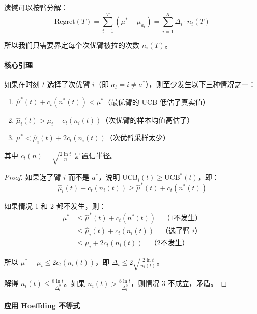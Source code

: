 遗憾可以按臂分解：
\begin{equation}
    \text{Regret}(T) = \sum_{t=1}^{T} (\mu^* - \mu_{a_t}) = \sum_{i=1}^{K} \Delta_i \cdot n_i(T)
\end{equation}

所以我们只需要界定每个次优臂被拉的次数 $n_i(T)$。

\paragraph{核心引理}\mbox{}\par\nopagebreak

\begin{lemma}[次优臂被拉的条件]
如果在时刻 $t$ 选择了次优臂 $i$（即 $a_t = i \neq a^*$），则至少发生以下三种情况之一：
\begin{enumerate}
    \item $\hat{\mu}^*(t) + c_t(n^*(t)) < \mu^*$（最优臂的 UCB 低估了真实值）
    \item $\hat{\mu}_i(t) > \mu_i + c_t(n_i(t))$（次优臂的样本均值高估了）
    \item $\mu^* < \hat{\mu}_i(t) + 2c_t(n_i(t))$（次优臂采样太少）
\end{enumerate}
其中 $c_t(n) = \sqrt{\frac{2\ln t}{n}}$ 是置信半径。
\end{lemma}

\begin{proof}
如果选了臂 $i$ 而不是 $a^*$，说明 $\text{UCB}_i(t) \geq \text{UCB}^*(t)$，即：
\begin{equation}
    \hat{\mu}_i(t) + c_t(n_i(t)) \geq \hat{\mu}^*(t) + c_t(n^*(t))
\end{equation}

如果情况 1 和 2 都不发生，则：
\begin{align}
    \mu^* &\leq \hat{\mu}^*(t) + c_t(n^*(t)) \quad \text{（1不发生）} \\
    &\leq \hat{\mu}_i(t) + c_t(n_i(t)) \quad \text{（选了臂 $i$）} \\
    &\leq \mu_i + 2c_t(n_i(t)) \quad \text{（2不发生）}
\end{align}

所以 $\mu^* - \mu_i \leq 2c_t(n_i(t))$，即 $\Delta_i \leq 2\sqrt{\frac{2\ln t}{n_i(t)}}$。

解得 $n_i(t) \leq \frac{8\ln t}{\Delta_i^2}$。如果 $n_i(t) > \frac{8\ln t}{\Delta_i^2}$，则情况 3 不成立，矛盾。
\end{proof}

\paragraph{应用 Hoeffding 不等式}

